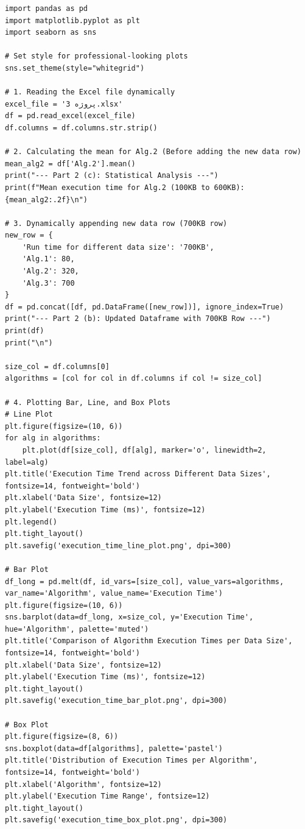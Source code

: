 \begin{latin}
\begin{lstlisting}
import pandas as pd
import matplotlib.pyplot as plt
import seaborn as sns

# Set style for professional-looking plots
sns.set_theme(style="whitegrid")

# 1. Reading the Excel file dynamically
excel_file = 'پروژه 3.xlsx'
df = pd.read_excel(excel_file)
df.columns = df.columns.str.strip()

# 2. Calculating the mean for Alg.2 (Before adding the new data row)
mean_alg2 = df['Alg.2'].mean()
print("--- Part 2 (c): Statistical Analysis ---")
print(f"Mean execution time for Alg.2 (100KB to 600KB): {mean_alg2:.2f}\n")

# 3. Dynamically appending new data row (700KB row)
new_row = {
    'Run time for different data size': '700KB',
    'Alg.1': 80,
    'Alg.2': 320,
    'Alg.3': 700
}
df = pd.concat([df, pd.DataFrame([new_row])], ignore_index=True)
print("--- Part 2 (b): Updated Dataframe with 700KB Row ---")
print(df)
print("\n")

size_col = df.columns[0]
algorithms = [col for col in df.columns if col != size_col]

# 4. Plotting Bar, Line, and Box Plots
# Line Plot
plt.figure(figsize=(10, 6))
for alg in algorithms:
    plt.plot(df[size_col], df[alg], marker='o', linewidth=2, label=alg)
plt.title('Execution Time Trend across Different Data Sizes', fontsize=14, fontweight='bold')
plt.xlabel('Data Size', fontsize=12)
plt.ylabel('Execution Time (ms)', fontsize=12)
plt.legend()
plt.tight_layout()
plt.savefig('execution_time_line_plot.png', dpi=300)

# Bar Plot
df_long = pd.melt(df, id_vars=[size_col], value_vars=algorithms, var_name='Algorithm', value_name='Execution Time')
plt.figure(figsize=(10, 6))
sns.barplot(data=df_long, x=size_col, y='Execution Time', hue='Algorithm', palette='muted')
plt.title('Comparison of Algorithm Execution Times per Data Size', fontsize=14, fontweight='bold')
plt.xlabel('Data Size', fontsize=12)
plt.ylabel('Execution Time (ms)', fontsize=12)
plt.tight_layout()
plt.savefig('execution_time_bar_plot.png', dpi=300)

# Box Plot
plt.figure(figsize=(8, 6))
sns.boxplot(data=df[algorithms], palette='pastel')
plt.title('Distribution of Execution Times per Algorithm', fontsize=14, fontweight='bold')
plt.xlabel('Algorithm', fontsize=12)
plt.ylabel('Execution Time Range', fontsize=12)
plt.tight_layout()
plt.savefig('execution_time_box_plot.png', dpi=300)
\end{lstlisting}
\end{latin}

